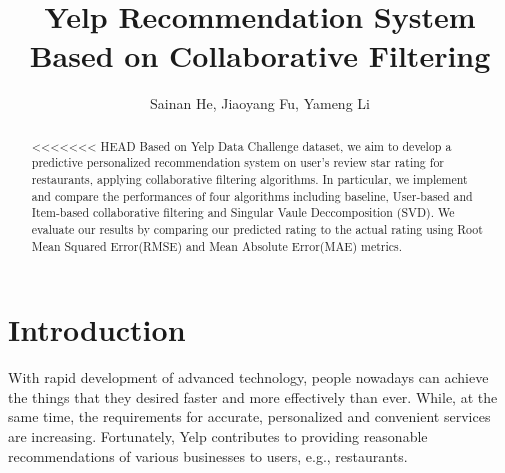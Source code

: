 \documentclass{llncs}
\begin{document}
%
\frontmatter          %
%
\pagestyle{headings}  %


%

%
\mainmatter              %
%
\title{Yelp Recommendation System Based on Collaborative Filtering}
%
%
\author{Sainan He, Jiaoyang Fu, Yameng Li}
%
%
%

\maketitle              %

\begin{abstract}
<<<<<<< HEAD
Based on Yelp Data Challenge dataset, we aim to develop a predictive personalized recommendation system on user’s review star rating for restaurants, applying collaborative filtering algorithms. In particular, we implement and compare the performances of four algorithms including baseline, User-based and Item-based collaborative filtering and Singular Vaule Deccomposition (SVD). We evaluate our results by comparing our predicted rating to the actual rating using Root Mean Squared Error(RMSE) and Mean Absolute Error(MAE) metrics.

\end{abstract}

\section{Introduction}
With rapid development of advanced technology, people nowadays can achieve the things that they desired faster and more effectively than ever. While, at the same time, the requirements for accurate, personalized and convenient services are increasing. Fortunately, Yelp contributes to providing reasonable recommendations of various businesses to users, e.g., restaurants.
\end{document}
